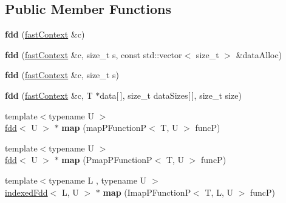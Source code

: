 \subsection*{Public Member Functions}
\begin{DoxyCompactItemize}
\item 
\hypertarget{classfaster_1_1fdd_3_01T_01_5_01_4_a5e4ef770313ef0061b7039102463d1bb}{}\label{classfaster_1_1fdd_3_01T_01_5_01_4_a5e4ef770313ef0061b7039102463d1bb} 
{\bfseries fdd} (\hyperlink{classfaster_1_1fastContext}{fast\+Context} \&c)
\item 
\hypertarget{classfaster_1_1fdd_3_01T_01_5_01_4_aeff7da6018786d1e58fefc80a04e0f41}{}\label{classfaster_1_1fdd_3_01T_01_5_01_4_aeff7da6018786d1e58fefc80a04e0f41} 
{\bfseries fdd} (\hyperlink{classfaster_1_1fastContext}{fast\+Context} \&c, size\+\_\+t s, const std\+::vector$<$ size\+\_\+t $>$ \&data\+Alloc)
\item 
\hypertarget{classfaster_1_1fdd_3_01T_01_5_01_4_aeece4f42b6eff6fef26a0c0fe9fc88fa}{}\label{classfaster_1_1fdd_3_01T_01_5_01_4_aeece4f42b6eff6fef26a0c0fe9fc88fa} 
{\bfseries fdd} (\hyperlink{classfaster_1_1fastContext}{fast\+Context} \&c, size\+\_\+t s)
\item 
\hypertarget{classfaster_1_1fdd_3_01T_01_5_01_4_ab844e7f258c74838fb468214325b50d6}{}\label{classfaster_1_1fdd_3_01T_01_5_01_4_ab844e7f258c74838fb468214325b50d6} 
{\bfseries fdd} (\hyperlink{classfaster_1_1fastContext}{fast\+Context} \&c, T $\ast$data\mbox{[}$\,$\mbox{]}, size\+\_\+t data\+Sizes\mbox{[}$\,$\mbox{]}, size\+\_\+t size)
\item 
\hypertarget{classfaster_1_1fdd_3_01T_01_5_01_4_ad3d34fd674c74c0d78b771c8b66c1597}{}\label{classfaster_1_1fdd_3_01T_01_5_01_4_ad3d34fd674c74c0d78b771c8b66c1597} 
{\footnotesize template$<$typename U $>$ }\\\hyperlink{classfaster_1_1fdd}{fdd}$<$ U $>$ $\ast$ {\bfseries map} (map\+P\+FunctionP$<$ T, U $>$ funcP)
\item 
\hypertarget{classfaster_1_1fdd_3_01T_01_5_01_4_a7c80a0dbb77a88c1c6158c8516b4c698}{}\label{classfaster_1_1fdd_3_01T_01_5_01_4_a7c80a0dbb77a88c1c6158c8516b4c698} 
{\footnotesize template$<$typename U $>$ }\\\hyperlink{classfaster_1_1fdd}{fdd}$<$ U $>$ $\ast$ {\bfseries map} (Pmap\+P\+FunctionP$<$ T, U $>$ funcP)
\item 
\hypertarget{classfaster_1_1fdd_3_01T_01_5_01_4_a56cd3496f7b7e836af3df5a511d2b3d7}{}\label{classfaster_1_1fdd_3_01T_01_5_01_4_a56cd3496f7b7e836af3df5a511d2b3d7} 
{\footnotesize template$<$typename L , typename U $>$ }\\\hyperlink{classfaster_1_1indexedFdd}{indexed\+Fdd}$<$ L, U $>$ $\ast$ {\bfseries map} (Imap\+P\+FunctionP$<$ T, L, U $>$ funcP)

\end{DoxyCompactItemize}
